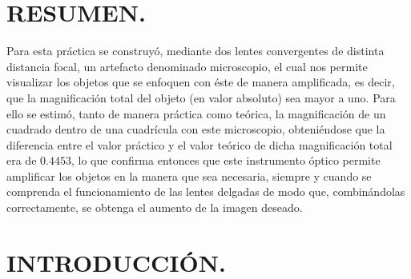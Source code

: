 \documentclass[10pt,a4paper]{article}
\begin{document}
\portada

\section{RESUMEN.} %
Para esta práctica se construyó, mediante dos lentes convergentes de distinta distancia focal, un artefacto denominado microscopio, el cual nos permite visualizar los objetos que se enfoquen con éste de manera amplificada, es decir, que la magnificación total del objeto (en valor absoluto) sea mayor a uno. Para ello se estimó, tanto de manera práctica como teórica, la magnificación de un cuadrado dentro de una cuadrícula con este microscopio, obteniéndose que la diferencia entre el valor práctico y el valor teórico de dicha magnificación total era de $0.4453$, lo que confirma entonces que este instrumento óptico permite amplificar los objetos en la manera que sea necesaria, siempre y cuando se comprenda el funcionamiento de las lentes delgadas de modo que, combinándolas correctamente, se obtenga el aumento de la imagen deseado.

\section{INTRODUCCIÓN.} %
\end{document}
